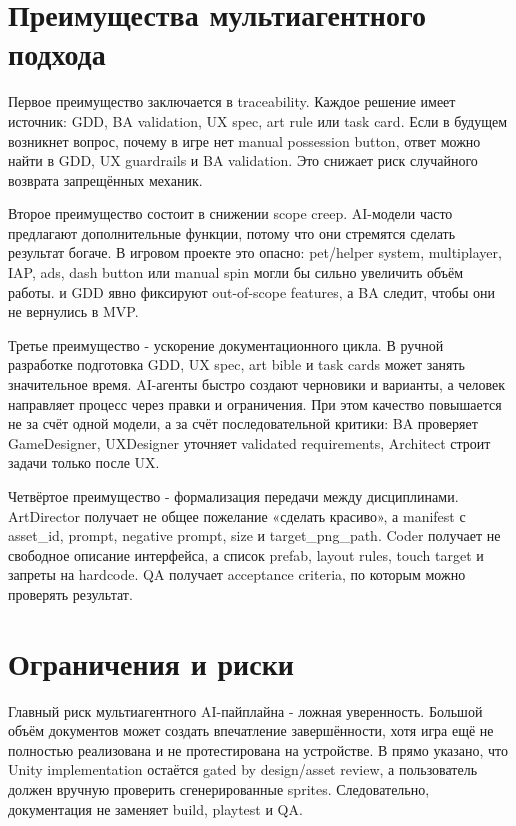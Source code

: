 \documentclass[a4paper,12pt]{report}
\newcommand{\file}[1]{\path{#1}}
\begin{document}
\section{Преимущества мультиагентного подхода}

Первое преимущество заключается в traceability. Каждое решение имеет источник: GDD, BA validation, UX spec, art rule или task card. Если в будущем возникнет вопрос, почему в игре нет manual possession button, ответ можно найти в GDD, UX guardrails и BA validation. Это снижает риск случайного возврата запрещённых механик.

Второе преимущество состоит в снижении scope creep. AI-модели часто предлагают дополнительные функции, потому что они стремятся сделать результат богаче. В игровом проекте это опасно: pet/helper system, multiplayer, IAP, ads, dash button или manual spin могли бы сильно увеличить объём работы. \file{AGENTS.md} и GDD явно фиксируют out-of-scope features, а BA следит, чтобы они не вернулись в MVP.

Третье преимущество - ускорение документационного цикла. В ручной разработке подготовка GDD, UX spec, art bible и task cards может занять значительное время. AI-агенты быстро создают черновики и варианты, а человек направляет процесс через правки и ограничения. При этом качество повышается не за счёт одной модели, а за счёт последовательной критики: BA проверяет GameDesigner, UXDesigner уточняет validated requirements, Architect строит задачи только после UX.

Четвёртое преимущество - формализация передачи между дисциплинами. ArtDirector получает не общее пожелание «сделать красиво», а manifest с asset\_id, prompt, negative prompt, size и target\_png\_path. Coder получает не свободное описание интерфейса, а список prefab, layout rules, touch target и запреты на hardcode. QA получает acceptance criteria, по которым можно проверять результат.

\section{Ограничения и риски}

Главный риск мультиагентного AI-пайплайна - ложная уверенность. Большой объём документов может создать впечатление завершённости, хотя игра ещё не полностью реализована и не протестирована на устройстве. В \file{STATUS.md} прямо указано, что Unity implementation остаётся gated by design/asset review, а пользователь должен вручную проверить сгенерированные sprites. Следовательно, документация не заменяет build, playtest и QA.
\end{document}
